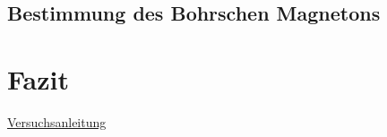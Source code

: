 \section{Bestimmung des Bohrschen Magnetons}
\chapter{Fazit}

\cleardoublepage{}
\newpage
\begin{thebibliography}{100}
   \url{Versuchsanleitung}
\end{thebibliography}


